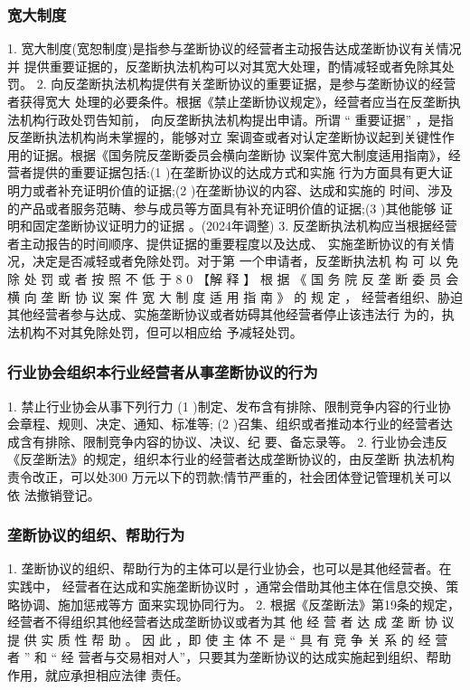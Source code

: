 \documentclass[UTF8,12pt]{ctexart}
\numberwithin{equation}{section} %
\numberwithin{figure}{section}
\numberwithin{table}{section}
\begin{document}
	\subsubsection{宽大制度}
	1. 宽大制度(宽恕制度)是指参与垄断协议的经营者主动报告达成垄断协议有关情况并 提供重要证据的，反垄断执法机构可以对其宽大处理，酌情减轻或者免除其处罚。
	2. 向反垄断执法机构提供有关垄断协议的重要证据，是参与垄断协议的经营者获得宽大 处理的必要条件。根据《禁止垄断协议规定》，经营者应当在反垄断执法机构行政处罚告知前， 向反垄断执法机构提出申请。所谓 “ 重要证据” ，是指反垄断执法机构尚未掌握的，能够对立 案调查或者对认定垄断协议起到关键性作用的证据。根据《国务院反垄断委员会横向垄断协 议案件宽大制度适用指南》，经营者提供的重要证据包括:(1 )在垄断协议的达成方式和实施
	行为方面具有更大证明力或者补充证明价值的证据;(2 )在垄断协议的内容、达成和实施的 时间、涉及的产品或者服务范畴、参与成员等方面具有补充证明价值的证据;(3 )其他能够 证明和固定垄断协议证明力的证据 。(2024年调整)
	3. 反垄断执法机构应当根据经营者主动报告的时间顺序、提供证据的重要程度以及达成、 实施垄断协议的有关情况，决定是否减轻或者免除处罚。对于第 一个申请者，反垄断执法机 构 可 以 免 除 处 罚 或 者 按 照 不 低 于 8 0 %
	【解 释 】 根 据 《 国 务 院 反 垄 断 委 员 会 横 向 垄 断 协 议 案 件 宽 大 制 度 适 用 指 南 》 的 规 定 ， 经营者组织、胁迫其他经营者参与达成、实施垄断协议或者妨碍其他经营者停止该违法行 为的，执法机构不对其免除处罚，但可以相应给 予减轻处罚。
	
	
	
	\subsubsection{行业协会组织本行业经营者从事垄断协议的行为}
	1. 禁止行业协会从事下列行力
	(1 )制定、发布含有排除、限制竞争内容的行业协会章程、规则、决定、通知、标准等; (2 )召集、组织或者推动本行业的经营者达成含有排除、限制竞争内容的协议、决议、纪 要、备忘录等。
	2. 行业协会违反《反垄断法》的规定，组织本行业的经营者达成垄断协议的，由反垄断 执法机构责令改正，可以处300 万元以下的罚款;情节严重的，社会团体登记管理机关可以依 法撤销登记。
	
	
	
	\subsubsection{垄断协议的组织、帮助行为}
	1. 垄断协议的组织、帮助行为的主体可以是行业协会，也可以是其他经营者。在实践中， 经营者在达成和实施垄断协议时 ，通常会借助其他主体在信息交换、策略协调、施加惩戒等方 面来实现协同行为。
	2. 根据《反垄断法》第19条的规定，经营者不得组织其他经营者达成垄断协议或者为其 他 经 营 者 达 成 垄 断 协 议 提 供 实 质 性 帮 助 。 因 此 ，即 使 主 体 不 是 “ 具 有 竞 争 关 系 的 经 营 者 ” 和 “ 经 营者与交易相对人”，只要其为垄断协议的达成实施起到组织、帮助作用，就应承担相应法律 责任。
	
\end{document}
